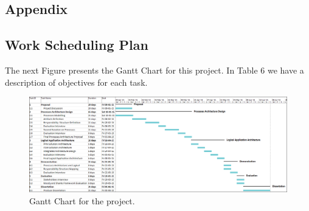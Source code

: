 
\begin{landscape}

\section{Appendix} %
\label{sec:attachments}


\subsection{Work Scheduling Plan} 

The next Figure presents the Gantt Chart for this project. In Table 6 we have a description of objectives for each task.



\begin{figure}[h!]
\centering
\includegraphics[height=0.55\textheight]{img/GanttChart2.png}
\caption{Gantt Chart for the project.}
\end{figure}

\end{landscape}

\newpage



